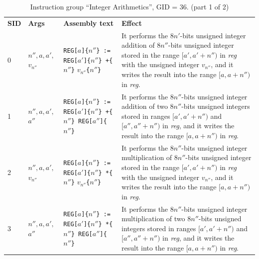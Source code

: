 \documentclass[10pt,twocolumn]{article}
\begin{document}
\begin{table}[!h]
\begin{center}
\def\arraystretch{1.5}
\begin{tabular}{lp{1.2cm}p{5.5cm}p{7.5cm}}
\textbf{SID} & \textbf{Args} & \textbf{Assembly text} & \textbf{Effect}
\\

0 & $ n'',a,a', $ \newline $ v_{n''} $ %
& \texttt{REG[}$ a $\texttt{]\{}$ n'' $\texttt{\} := REG[}$ a' $\texttt{]\{}$
n'' $\texttt{\} +\{}$ n'' $\texttt{\}} $ v_{n''} $\texttt{\{}$ n'' $\texttt{\}} %
& It performs the $ 8n' $-bits unsigned integer addition of $ 8n'' $-bits
unsigned integer stored in the range $ [a',a'+n'') $ in \textit{reg} with the
unsigned integer $ v_{n''} $, and it writes the result into the range $ [a,a+n'')
$ in \textit{reg}. \\

1 & $ n'',a,a',$ \newline $ a'' $ %
& \texttt{REG[}$ a $\texttt{]\{}$ n'' $\texttt{\} := REG[}$ a' $\texttt{]\{}$
n'' $\texttt{\} +\{}$ n'' $\texttt{\} REG[}$ a'' $\texttt{]\{}$ n'' $\texttt{\}}
%
& It performs the $ 8n'' $-bits unsigned integer addition of two $ 8n'' $-bits
unsigned integers stored in ranges $ [a',a'+n'') $ and $ [a'',a''+n'') $ in
\textit{reg}, and it writes the result into the range $ [a,a+n'') $ in
\textit{reg}. \\

2 & $ n'',a,a', $ \newline $ v_{n''} $ %
& \texttt{REG[}$ a $\texttt{]\{}$ n'' $\texttt{\} := REG[}$ a' $\texttt{]\{}$
n'' $\texttt{\} *\{}$ n'' $\texttt{\}} $ v_{n''} $\texttt{\{}$ n'' $\texttt{\}} %
& It performs the $ 8n'' $-bits unsigned integer multiplication of $ 8n'' $-bits
unsigned integer stored in the range $ [a',a'+n'') $ in \textit{reg} with the
unsigned integer $ v_{n''} $, and it writes the result into the range $ [a,a+n'')
$ in \textit{reg}. \\

3 & $ n'',a,a',$ \newline $ a'' $ %
& \texttt{REG[}$ a $\texttt{]\{}$ n'' $\texttt{\} := REG[}$ a' $\texttt{]\{}$
n'' $\texttt{\} *\{}$ n'' $\texttt{\} REG[}$ a'' $\texttt{]\{}$ n'' $\texttt{\}}
%
& It performs the $ 8n'' $-bits unsigned integer multiplication of two $ 8n''
$-bits unsigned integers stored in ranges $ [a',a'+n'') $ and $ [a'',a''+n'') $ in
\textit{reg}, and it writes the result into the range $ [a,a+n'') $ in
\textit{reg}. \\

\end{tabular}
\end{center}
\caption{Instruction group ``Integer Arithmetics'', GID = 36. (part 1 of 2)}
\label{tab:igroup:integer_arithmetics}
\end{table}
\end{document}
